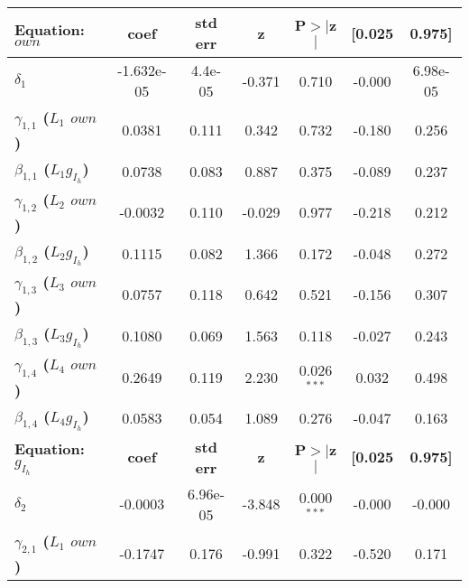 \label{Estimacao}
\begin{threeparttable}
	\centering
	\begin{tabular}{lcccccc}
		\hline \hline
		\textbf{Equation:} $own$ & \textbf{coef} & \textbf{std err} & \textbf{z} & \textbf{P$> |$z$|$} & \textbf{[0.025} & \textbf{0.975]}  \\
		\midrule
		\textbf{$\delta_{1}$}      &   -1.632e-05  &      4.4e-05     &    -0.371  &         0.710        &       -0.000    &     6.98e-05     \\
		\textbf{$\gamma_{1,1}$ ($L_1$ $own$)} &       0.0381  &        0.111     &     0.342  &         0.732        &       -0.180    &        0.256     \\
		\textbf{$\beta_{1,1}$ ($L_1 g_{I_h}$)}           &       0.0738  &        0.083     &     0.887  &         0.375        &       -0.089    &        0.237     \\
		\textbf{$\gamma_{1,2}$ ($L_2$ $own$)} &      -0.0032  &        0.110     &    -0.029  &         0.977        &       -0.218    &        0.212     \\
		\textbf{$\beta_{1,2}$ ($L_2 g_{I_h}$)}           &       0.1115  &        0.082     &     1.366  &         0.172        &       -0.048    &        0.272     \\
		\textbf{$\gamma_{1,3}$ ($L_3$ $own$)} &       0.0757  &        0.118     &     0.642  &         0.521        &       -0.156    &        0.307     \\
		\textbf{$\beta_{1,3}$ ($L_3 g_{I_h}$)}           &       0.1080  &        0.069     &     1.563  &         0.118        &       -0.027    &        0.243     \\
		\textbf{$\gamma_{1,4}$ ($L_4$ $own$)} &       0.2649  &        0.119     &     2.230  &         0.026$^{***}$        &        0.032    &        0.498     \\
		\textbf{$\beta_{1,4}$ ($L_4 g_{I_h}$)}           &      0.0583  &        0.054     &    1.089  &         0.276        &       -0.047    &       0.163     \\
		\midrule
		\textbf{Equation:} $g_{I_h}$ & \textbf{coef} & \textbf{std err} & \textbf{z} & \textbf{P$> |$z$|$} & \textbf{[0.025} & \textbf{0.975]}  \\
		\midrule
		\textbf{$\delta_{2}$}      &      -0.0003  &     6.96e-05     &    -3.848  &         0.000$^{***}$        &       -0.000    &       -0.000     \\
		\textbf{$\gamma_{2,1}$ ($L_1$ $own$)} &      -0.1747  &        0.176     &    -0.991  &         0.322        &       -0.520    &        0.171     \\

\end{tabular}
\end{threeparttable}
